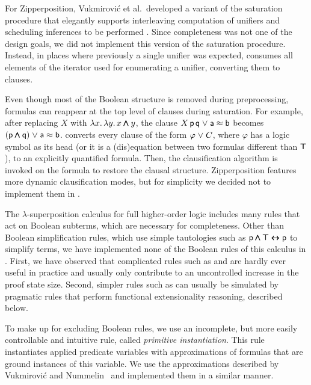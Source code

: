 For Zipperposition, Vukmirovi\'c et al.\ developed a variant of the saturation
procedure that elegantly supports interleaving computation of unifiers and
scheduling
inferences to be performed \cite{section-making-ho-work}. Since completeness was
not one of the \ehohii{} design goals, we did not implement this version of the
saturation procedure. Instead, in places where previously a single unifier was
expected, \ehohii{} consumes all elements of the iterator used for enumerating a
unifier, converting them to clauses. 

 Even though most of the Boolean structure is
removed during preprocessing, formulas can reappear at the top level of
clauses during saturation. For example, after replacing $X$ with $\lambda x.
\, \lambda y.\, x \pmb\land y$, the clause $X \, \mathsf{p} \, \mathsf{q} \mathrel\lor \mathsf{a}
\approx \mathsf{b}$ becomes $(\mathsf{p} \pmb\land \mathsf{q}) \mathrel\lor \mathsf{a} \approx \mathsf{b}$. \ehohii{}
converts every clause of the form $\varphi \mathrel\lor C$, where $\varphi$ has a logic symbol
as its head (or it is a (dis)equation between two formulas different than $\pmb\top$),
to an explicitly quantified formula. Then, the clausification algorithm
is invoked on the formula to restore the clausal structure. Zipperposition features
more dynamic clausification modes, but for simplicity we decided
not to implement them in \ehohii{}.

The $\lambda$-superposition calculus for full higher-order logic
\cite{bbtv-21-full-ho-sup} includes many rules that act on Boolean subterms,
which are necessary for completeness. Other than Boolean simplification rules,
which use simple tautologies such as $\mathsf{p} \pmb\land \pmb\top \pmb\leftrightarrow\mathsf{p}$ to simplify terms, we
have implemented none of the Boolean rules of this calculus in \ehohii{}. First, we have
observed that complicated rules such as  and
 are hardly ever useful in practice and usually only
contribute to an uncontrolled increase in the proof state size. Second, simpler
rules such as  can usually be simulated by pragmatic rules
that perform functional extensionality reasoning, described below.

To make up for excluding Boolean rules, we use an incomplete, but more
easily controllable and intuitive rule, called \emph{primitive instantiation}. This
rule instantiates applied predicate variables with approximations of formulas
that are ground instances of this variable. We use the approximations described
by Vukmirovi\'c and Nummelin~\cite[Sect.~3.3]{bool-chapter} and
implemented them in a similar manner.


